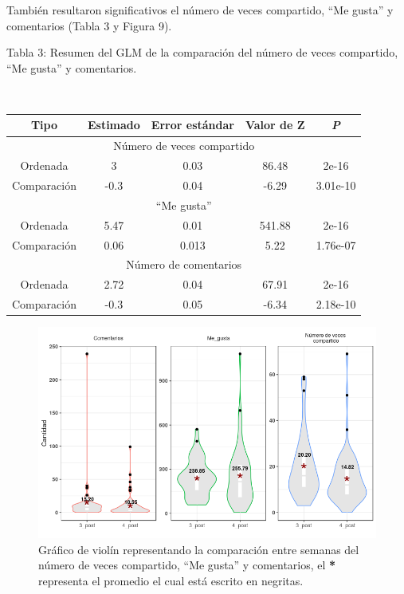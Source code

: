 \documentclass[a4paper,10pt]{article}
\begin{document}
También resultaron significativos el número de veces compartido,  
``Me gusta'' y comentarios (Tabla 3 y Figura 9).

\begin{center}
 \caption{Tabla 3: Resumen del GLM de la comparación del  número de veces compartido, ``Me gusta'' y comentarios.} \\ [0.3cm]
 {\footnotesize
 \begin{tabular}{c|c|c|c|c}
  \hline 
  Tipo & Estimado & Error estándar & Valor de Z & \textit{P}\\
  \hline 
  \multicolumn{5}{c}{Número de veces compartido}\\
  \hline
  Ordenada & 3 & 0.03 & 86.48 & 2e-16 \\
  Comparación & -0.3 & 0.04 & -6.29 & 3.01e-10\\
  \hline 
  \multicolumn{5}{c}{``Me gusta''}\\
  \hline
  Ordenada & 5.47 &  0.01 & 541.88 & 2e-16 \\
  Comparación & 0.06 & 0.013 & 5.22 & 1.76e-07\\
  \hline
  \multicolumn{5}{c}{Número de comentarios}\\
  \hline
  Ordenada & 2.72 & 0.04 & 67.91 & 2e-16\\
  Comparación & -0.3 & 0.05 & -6.34 & 2.18e-10 \\
  \hline
 \end{tabular}
 }	    
\end{center}

\begin{figure}[H]
 \begin{center}
  \includegraphics[width=.75\textwidth]{imagenes/graficas/comparacion2.png}
  \caption{Gráfico de violín representando la comparación entre semanas del número de veces compartido, ``Me gusta'' y comentarios,
  el \textbf{*} representa el promedio el cual está escrito en negritas.}
 \end{center}
\end{figure}
\end{document}
